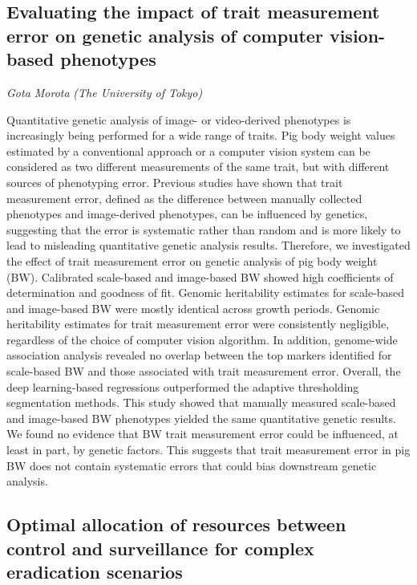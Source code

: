 \documentclass[
]{scrreprt}
\begin{document}
\subsection{Evaluating the impact of trait measurement error on genetic
analysis of computer vision-based
phenotypes}\label{evaluating-the-impact-of-trait-measurement-error-on-genetic-analysis-of-computer-vision-based-phenotypes}

\emph{Gota Morota} \emph{(The University of Tokyo)}

\setlength{\parskip}{0.5em}

Quantitative genetic analysis of image- or video-derived phenotypes is
increasingly being performed for a wide range of traits. Pig body weight
values estimated by a conventional approach or a computer vision system
can be considered as two different measurements of the same trait, but
with different sources of phenotyping error. Previous studies have shown
that trait measurement error, defined as the difference between manually
collected phenotypes and image-derived phenotypes, can be influenced by
genetics, suggesting that the error is systematic rather than random and
is more likely to lead to misleading quantitative genetic analysis
results. Therefore, we investigated the effect of trait measurement
error on genetic analysis of pig body weight (BW). Calibrated
scale-based and image-based BW showed high coefficients of determination
and goodness of fit. Genomic heritability estimates for scale-based and
image-based BW were mostly identical across growth periods. Genomic
heritability estimates for trait measurement error were consistently
negligible, regardless of the choice of computer vision algorithm. In
addition, genome-wide association analysis revealed no overlap between
the top markers identified for scale-based BW and those associated with
trait measurement error. Overall, the deep learning-based regressions
outperformed the adaptive thresholding segmentation methods. This study
showed that manually measured scale-based and image-based BW phenotypes
yielded the same quantitative genetic results. We found no evidence that
BW trait measurement error could be influenced, at least in part, by
genetic factors. This suggests that trait measurement error in pig BW
does not contain systematic errors that could bias downstream genetic
analysis.

\subsection{Optimal allocation of resources between control and
surveillance for complex eradication
scenarios}\label{optimal-allocation-of-resources-between-control-and-surveillance-for-complex-eradication-scenarios}
\end{document}
